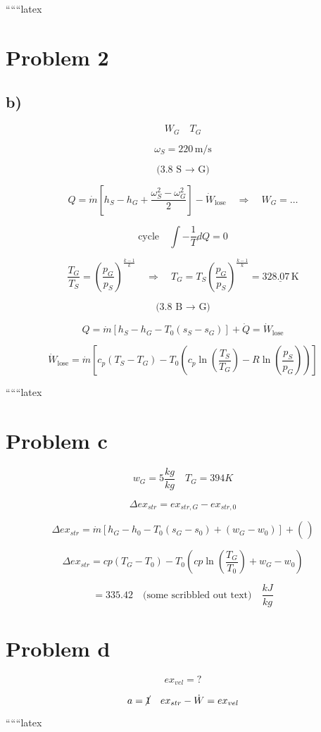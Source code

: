 ``````latex

\section*{Problem 2}

\subsection*{b)}

\[
W_G \quad T_G
\]

\[
\omega_S = 220 \, \text{m/s}
\]

\[
\text{(3.8 S $\rightarrow$ G)}
\]

\[
Q = \dot{m} \left[ h_S - h_G + \frac{\omega_S^2 - \omega_G^2}{2} \right] - \dot{W}_{\text{lose}} \quad \Rightarrow \quad W_G = \ldots
\]

\[
\text{cycle} \quad \int - \frac{1}{T} dQ = 0
\]

\[
\frac{T_G}{T_S} = \left( \frac{p_G}{p_S} \right)^{\frac{k-1}{k}} \quad \Rightarrow \quad T_G = T_S \left( \frac{p_G}{p_S} \right)^{\frac{k-1}{k}} = \underline{328.07 \, \text{K}}
\]

\[
\text{(3.8 B $\rightarrow$ G)}
\]

\[
Q = \dot{m} \left[ h_S - h_G - T_0 (s_S - s_G) \right] + \dot{Q} = \dot{W}_{\text{lose}}
\]

\[
\dot{W}_{\text{lose}} = \dot{m} \left[ c_p (T_S - T_G) - T_0 \left( c_p \ln \left( \frac{T_S}{T_G} \right) - R \ln \left( \frac{p_S}{p_G} \right) \right) \right]
\]

``````latex

\section*{Problem c}

\[
w_G = 5 \frac{kg}{kg} \quad T_G = 394K
\]


\[
\Delta ex_{str} = ex_{str,G} - ex_{str,0}
\]

\[
\Delta ex_{str} = \dot{m} \left[ h_G - h_0 - T_0 (s_G - s_0) + (w_G - w_0) \right] + \left( \frac{}{} \right)
\]

\[
\Delta ex_{str} = cp (T_G - T_0) - T_0 \left( cp \ln \left( \frac{T_G}{T_0} \right) + w_G - w_0 \right)
\]

\[
= 335.42 \quad \text{(some scribbled out text)} \quad \frac{kJ}{kg}
\]

\section*{Problem d}

\[
ex_{vel} = ?
\]

\[
a = \cancel{1} \quad ex_{str} - \dot{W} = ex_{vel}
\]

``````latex


